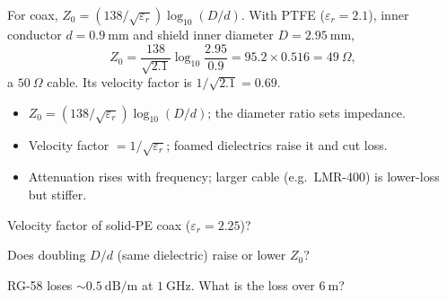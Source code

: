 \begin{workedexample}
For coax, $Z_0 = (138/\sqrt{\varepsilon_r})\log_{10}(D/d)$. With PTFE
($\varepsilon_r = 2.1$), inner conductor $d = 0.9\ \text{mm}$ and shield inner
diameter $D = 2.95\ \text{mm}$,
\[ Z_0 = \frac{138}{\sqrt{2.1}}\log_{10}\frac{2.95}{0.9}
   = 95.2\times0.516 = 49\ \Omega, \]
a $50\ \Omega$ cable. Its velocity factor is $1/\sqrt{2.1} = 0.69$.
\end{workedexample}

\begin{keytakeaways}
\begin{itemize}[leftmargin=1.4em,itemsep=2pt]
\item $Z_0 = (138/\sqrt{\varepsilon_r})\log_{10}(D/d)$; the diameter ratio sets impedance.
\item Velocity factor $= 1/\sqrt{\varepsilon_r}$; foamed dielectrics raise it and cut loss.
\item Attenuation rises with frequency; larger cable (e.g.\ LMR-400) is lower-loss but stiffer.
\end{itemize}
\end{keytakeaways}

\begin{exercises}
\item Velocity factor of solid-PE coax ($\varepsilon_r = 2.25$)?
\item Does doubling $D/d$ (same dielectric) raise or lower $Z_0$?
\item RG-58 loses $\sim0.5\ \text{dB/m}$ at $1\ \text{GHz}$. What is the loss over $6\ \text{m}$?
\end{exercises}

